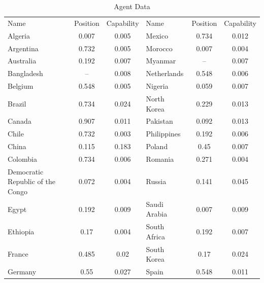 \begin{landscape}
\begin{table}
\centering
    \caption{Agent Data}
    \label{table:icews_agent_data}
\begin{tabular}{lcc|lcc}
    \hline
        Name                             & Position & Capability & Name                     & Position & Capability \\
    Algeria                          & 0.007    & 0.005      & Mexico                   & 0.734    & 0.012      \\
    Argentina                        & 0.732    & 0.005      & Morocco                  & 0.007    & 0.004      \\
    Australia                        & 0.192    & 0.007      & Myanmar                  & --      & 0.007      \\
    Bangladesh                       & --       & 0.008      & Netherlands              & 0.548    & 0.006      \\
    Belgium                          & 0.548    & 0.005      & Nigeria                  & 0.059    & 0.007      \\
    Brazil                           & 0.734    & 0.024      & North Korea              & 0.229    & 0.013      \\
    Canada                           & 0.907    & 0.011      & Pakistan                 & 0.092    & 0.013      \\
    Chile                            & 0.732    & 0.003      & Philippines              & 0.192    & 0.006      \\
    China                            & 0.115    & 0.183      & Poland                   & 0.45     & 0.007      \\
    Colombia                         & 0.734    & 0.006      & Romania                  & 0.271    & 0.004      \\
    Democratic Republic of the Congo & 0.072    & 0.004      & Russia                   & 0.141    & 0.045      \\
    Egypt                            & 0.192    & 0.009      & Saudi Arabia             & 0.007    & 0.009      \\
    Ethiopia                         & 0.17     & 0.004      & South Africa             & 0.192    & 0.007      \\
    France                           & 0.485    & 0.02       & South Korea              & 0.17     & 0.024      \\
    Germany                          & 0.55     & 0.027      & Spain                    & 0.548    & 0.011      \\

\end{tabular}
\end{table}
\end{landscape}
